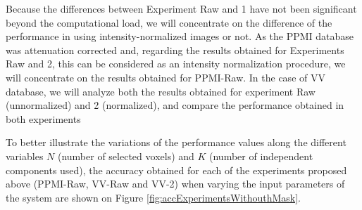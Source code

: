 	Because the differences between Experiment Raw and 1 have not been significant beyond the computational load, we will concentrate on the difference of the performance in using intensity-normalized images or not. As the PPMI database was attenuation corrected and, regarding the results obtained for Experiments Raw and 2, this can be considered as an intensity normalization procedure, we will concentrate on the results obtained for PPMI-Raw. In the case of VV database, we will analyze both the results obtained for experiment Raw (unnormalized) and 2 (normalized), and compare the performance obtained in both experiments
	
	To better illustrate the variations of the performance values along the different variables $N$ (number of selected voxels) and $K$ (number of independent components used), the accuracy obtained for each of the experiments proposed above (PPMI-Raw, VV-Raw and VV-2) when varying the input parameters of the system are shown on Figure \ref{fig:accExperimentsWithouthMask}.
	

